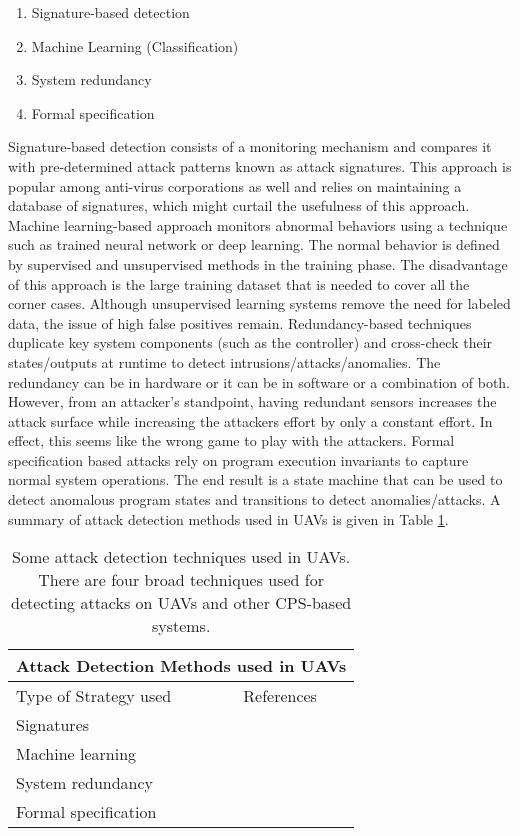 \begin{enumerate}
	\item Signature-based detection
	\item Machine Learning (Classification)
	\item System redundancy
	\item Formal specification
\end{enumerate} 
 
Signature-based detection consists of a monitoring mechanism and compares it with pre-determined attack patterns known as attack signatures. This approach is popular among anti-virus corporations as well and relies on maintaining a database of signatures, which might curtail the usefulness of this approach. Machine learning-based approach monitors abnormal behaviors using a technique such as trained neural network or deep learning. The normal behavior is defined by supervised and unsupervised methods in the training phase. The disadvantage of this approach is the large training dataset that is needed to cover all the corner cases. Although unsupervised learning systems remove the need for labeled data, the issue of high false positives remain. Redundancy-based techniques duplicate key system components (such as the controller) and cross-check their states/outputs at runtime to detect intrusions/attacks/anomalies. The redundancy can be in hardware or it can be in software or a combination of both. However, from an attacker's standpoint, having redundant sensors increases the attack surface while increasing the attackers effort by only a constant effort. In effect, this seems like the wrong game to play with the attackers. Formal specification based attacks rely on program execution invariants to capture normal system operations. The end result is a state machine that can be used to detect anomalous program states and transitions to detect anomalies/attacks. A summary of attack detection methods used in UAVs is given in Table \ref{table:attack-detection-uav}.

\begin{table}[h]
\caption{Some attack detection techniques used in UAVs. There are four broad techniques used for detecting attacks on UAVs and other CPS-based systems.}
\begin{tabular}{ |p{3cm}|p{3cm}|}
 \hline
 \multicolumn{2}{|c|}{Attack Detection Methods used in UAVs} \\
 \hline
 Type of Strategy used & References \\
 \hline
 Signatures & \cite{gao2014cyber, kaur2013automatic}\\
 \hline
 Machine learning & \cite{abbaspour2016detection, chen2018learning, junejo2016behaviour, shen2014novel}\\
 \hline
 System redundancy& \cite{fei2018cross, frank1990fault, xu1987fuzzy, yoon2017virtualdrone}  \\
 \hline
 Formal specification & \cite{bak2011sandboxing, mitchell2014adaptive,  mitchell2015behavior, zimmer2010time}  \\
 \hline
\end{tabular}

\label{table:attack-detection-uav}
\end{table}




